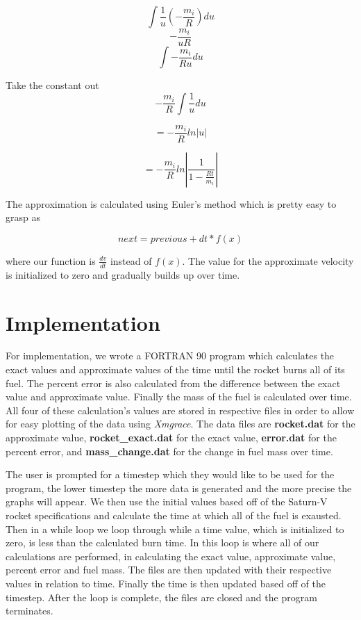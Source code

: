 \documentclass[11pt]{article}
\begin{document}
\begin{equation}
\int{\frac{1}{u}(-\frac{m_i}{R})du}
\end{equation}
\begin{equation}
- \frac{m_i}{uR}
\end{equation}
\begin{equation}
\int{-\frac{m_i}{Ru} du}
\end{equation}

Take the constant out
\begin{equation}
-\frac{m_i}{R} \int{\frac{1}{u}du}
\end{equation}

\begin{equation}
= -\frac{m_i}{R}ln|u|
\end{equation}

\begin{equation}
= -\frac{m_i}{R}ln|\frac{1}{1-\frac{Rt}{m_i}}|
\end{equation}

The approximation is calculated using Euler's method which is pretty easy to grasp as

\begin{equation}
next = previous + dt * f(x)
\end{equation}

\noindent where our function is $\frac{dv}{dt}$ instead of $f(x)$. The value for the approximate velocity is initialized to zero and gradually builds up over time.


\section{Implementation}
For implementation, we wrote a FORTRAN 90 program which calculates the exact values and approximate values of the time until the rocket burns all of its fuel. The percent error is also calculated from the difference between the exact value and approximate value. Finally the mass of the fuel is calculated over time. All four of these calculation's values are stored in respective files in order to allow for easy plotting of the data using \textit{Xmgrace}. The data files are \textbf{rocket.dat} for the approximate value, \textbf{rocket\_exact.dat} for the exact value, \textbf{error.dat} for the percent error, and \textbf{mass\_change.dat} for the change in fuel mass over time.

The user is prompted for a timestep which they would like to be used for the program, the lower timestep the more data is generated and the more precise the graphs will appear. We then use the initial values based off of the Saturn-V rocket specifications and calculate the time at which all of the fuel is exausted. Then in a while loop we loop through while a time value, which is initialized to zero, is less than the calculated burn time. In this loop is where all of our calculations are performed, in calculating the exact value, approximate value, percent error and fuel mass. The files are then updated with their respective values in relation to time. Finally the time is then updated based off of the timestep. After the loop is complete, the files are closed and the program terminates.
\end{document}

